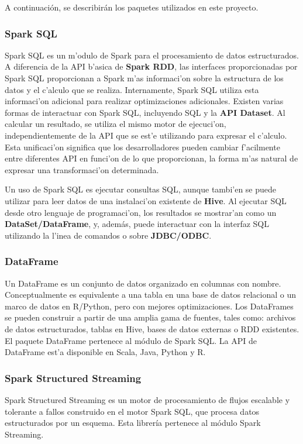 A continuación, se describirán los paquetes utilizados en este proyecto.


\subsubsection{Spark SQL}
Spark SQL es un m'odulo de Spark para el procesamiento de datos estructurados. A diferencia de la API b'asica de \textbf{Spark RDD}, las interfaces proporcionadas por Spark SQL proporcionan a Spark m'as informaci'on sobre la estructura de los datos y el c'alculo que se realiza. Internamente, Spark SQL utiliza esta informaci'on adicional para realizar optimizaciones adicionales. Existen varias formas de interactuar con Spark SQL, incluyendo SQL y la \textbf{API Dataset}. Al calcular un resultado, se utiliza el mismo motor de ejecuci'on, independientemente de la API que se est'e utilizando para expresar el c'alculo. Esta unificaci'on significa que los desarrolladores pueden cambiar f'acilmente entre diferentes API en funci'on de lo que proporcionan, la forma m'as natural de expresar una transformaci'on determinada.

Un uso de Spark SQL es ejecutar consultas SQL, aunque tambi'en se puede utilizar para leer datos de una instalaci'on existente de \textbf{Hive}.
Al ejecutar SQL desde otro lenguaje de programaci'on, los resultados se mostrar'an como un \textbf{DataSet/DataFrame}, y, además, puede interactuar con la interfaz SQL utilizando la l'inea de comandos o sobre\textbf{ JDBC/ODBC}.



\subsubsection{DataFrame}
Un DataFrame es un conjunto de datos organizado en columnas con nombre. Conceptualmente es equivalente a una tabla en una base de datos relacional o un marco de datos en R/Python, pero con mejores optimizaciones. Los DataFrames se pueden construir a partir de una amplia gama de fuentes, tales como: archivos de datos estructurados, tablas en Hive, bases de datos externas o RDD existentes. El paquete DataFrame pertenece al módulo de Spark SQL. La API de DataFrame est'a disponible en Scala, Java, Python y R.\cite{spark2}

\subsubsection{Spark Structured Streaming}
Spark Structured Streaming es un motor de procesamiento de flujos escalable y tolerante a fallos construido en el motor Spark SQL, que procesa datos estructurados por un esquema. Esta librería pertenece al módulo Spark Streaming. 

